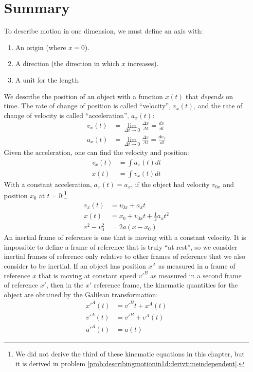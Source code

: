 \newpage
\section{Summary}
\vspace{0.25cm}
\begin{chapterSummary}
To describe motion in one dimension, we must define an axis with:
\begin{enumerate}
\item An origin (where $x=0$).
\item A direction (the direction in which $x$ increases).
\item A unit for the length.
\end{enumerate}
We describe the position of an object with a function $x(t)$ that \textit{depends} on time. The rate of change of position is called ``velocity'', $v_x(t)$, and the rate of change of velocity is called ``acceleration'', $a_x(t)$:
\begin{align*}
v_x(t)&=\lim_{\Delta t\to 0}\frac{\Delta x}{\Delta t}=\frac{dx}{dt}\\
a_x(t)&=\lim_{\Delta t\to 0}\frac{\Delta v}{\Delta t}=\frac{dv_x}{dt}
\end{align*}
Given the acceleration, one can find the velocity and position:
\begin{align*}
v_x(t)&=\int a_x(t)dt\\
x(t)&=\int v_x(t)dt
\end{align*}
With a constant acceleration, $a_x(t)=a_x$, if the object had velocity $v_{0x}$ and position $x_0$ at $t=0$:\footnote{We did not derive the third of these kinematic equations in this chapter, but it is derived in problem \ref{prob:describingmotionin1d:derivtimeindependent}.} 
\begin{align*}
v_x(t)&=v_{0x}+a_xt\\
x(t)&=x_0+v_{0x}t+\frac{1}{2}a_xt^2\\
v^2-v_0^2&=2a(x-x_0) 
\end{align*}
An inertial frame of reference is one that is moving with a constant velocity. It is impossible to define a frame of reference that is truly ``at rest'', so we consider inertial frames of reference only relative to other frames of reference that we also consider to be inertial. If an object has position $x^A$ as measured in a frame of reference $x$ that is moving at constant speed $v'^B$ as measured in a second frame of reference $x'$, then in the $x'$ reference frame, the kinematic quantities for the object are obtained by the Galilean transformation:
\begin{align*}
x'^A(t) &= v'^Bt + x^A(t)\\
v'^A(t) &=v'^B+v^A(t)\\
a'^A(t) &= a(t)
\end{align*}
\end{chapterSummary}


